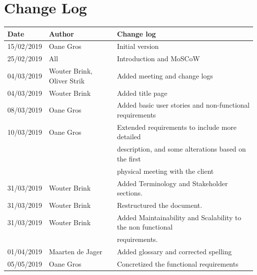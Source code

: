 \documentclass{article}
\begin{document}
\section{Change Log}
\begin{center}
 \begin{tabular}{ | l | l | l | }
  \hline
  \bf{Date} & \bf{Author} & \bf{Change log} \\
  \hline
  15/02/2019 & Oane Gros & Initial version \\
  \hline
  25/02/2019 & All & Introduction and MoSCoW \\
  \hline
  04/03/2019 & Wouter Brink, Oliver Strik & Added meeting and change logs\\
  \hline
  04/03/2019 & Wouter Brink & Added title page \\
  \hline
  08/03/2019 & Oane Gros & Added basic user stories and non-functional requirements \\
  \hline
  10/03/2019 & Oane Gros & Extended requirements to include more detailed \\  & & description,
   and some alterations based on the first \\ & & physical meeting with the client \\
  \hline
  31/03/2019 & Wouter Brink & Added Terminology and Stakeholder sections. \\
  \hline
  31/03/2019 & Wouter Brink & Restructured the document. \\
  \hline
  31/03/2019 & Wouter Brink & Added Maintainability and Scalability to the non functional \\
  & & requirements. \\
  \hline
  01/04/2019 & Maarten de Jager & Added glossary and corrected spelling \\
  \hline
  05/05/2019 & Oane Gros & Concretized the functional requirements \\
  \hline
 \end{tabular}
\end{center}
\end{document}
